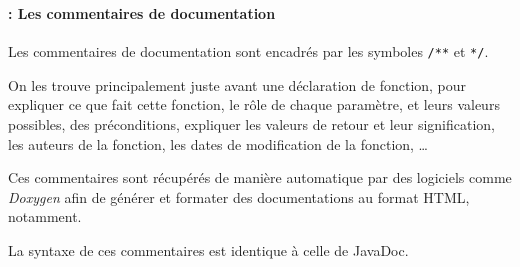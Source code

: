 \begin{frame}[containsverbatim]
  \frametitle{\secname}
  \framesubtitle{\subsecname : Les commentaires de documentation}
  Les commentaires de documentation sont encadrés par les symboles \verb|/**| et \verb|*/|.
  \vspace{0.5cm}
  \par
  On les trouve principalement juste avant une déclaration de fonction, pour expliquer ce que fait cette fonction, le rôle de chaque paramètre, et leurs valeurs possibles, 
  des préconditions, expliquer les valeurs de retour et leur signification, les auteurs de la fonction, les dates de modification de la fonction, \ldots
  \vspace{0.5cm}
  \par
  Ces commentaires sont récupérés de manière automatique par des logiciels comme \emph{Doxygen} afin de générer et formater des documentations au format HTML, notamment.
  \vspace{0.5cm}
  \par
  La syntaxe de ces commentaires est identique à celle de JavaDoc.
\end{frame}

